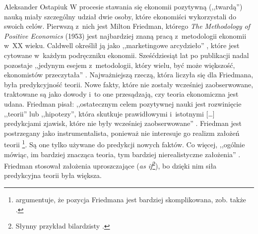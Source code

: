 \begin{artplenv}{Aleksander Ostapiuk}
W procesie stawania się ekonomii pozytywną (,,twardą'') nauką miały szczególny udział dwie osoby, które ekonomiści
wykorzystali do swoich celów. Pierwszą z~nich jest Milton Friedman, którego \textit{The Methodology of Positive
Economics} (1953) jest najbardziej znaną pracą z~metodologii ekonomii w~XX wieku. Caldwell określił ją jako
,,marketingowe arcydzieło''
\parencite[s.~173]{caldwell_beyond_1982},
które jest cytowane w~każdym podręczniku
ekonomii. Sześćdziesiąt lat po publikacji nadal pozostaje ,,jedynym esejem z~metodologii, który wielu, być może
większość, ekonomistów przeczytała''
\parencite[s.~162]{hausman_inexact_1992}.
Najważniejszą rzeczą, która
liczyła się dla Friedmana, była predykcyjność teorii. Nowe fakty, które nie zostały wcześniej zaobserwowane, traktowane są jako
dowody i~to one przesądzają, czy teoria ekonomiczna jest udana. Friedman pisał: ,,ostatecznym celem pozytywnej nauki jest
rozwinięcie ,,teorii'' lub ,,hipotezy'', która skutkuje prawidłowymi i~istotnymi [\ldots] predykcjami zjawisk, które nie były
wcześniej zaobserwowane''
\parencite[s.~7]{friedman_essays_1953}.
Friedman jest postrzegany jako
instrumentalista, ponieważ nie interesuje go realizm założeń teorii
\parencite{boland_critique_1979,caldwell_critique_1992}\footnote{%
\parencite{maki_unrealistic_2009}
argumentuje, że pozycja Friedmana jest bardziej skomplikowana,
zob. także
\parencite{hoyningen-huene_revisiting_2017}.
}. Są one tylko używane do predykcji nowych faktów. Co
więcej, ,,ogólnie mówiąc, im bardziej znacząca teoria, tym bardziej nierealistyczne założenia''
\parencite[s.~14]{friedman_essays_1953}.
Friedman stosował założenia uproszczające (\textit{as if}\footnote{Słynny przykład bilardzisty
\parencite[s.~13]{friedman_essays_1953}.
}), bo dzięki nim siła predykcyjna teorii była większa. 


\end{artplenv}
